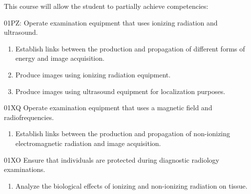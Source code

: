 {This course will allow the student to partially achieve competencies:

01PZ: Operate examination equipment that uses ionizing radiation and ultrasound.
\begin{enumerate}
\item Establish links between the production and propagation of different forms of energy and image acquisition.
\item Produce images using ionizing radiation equipment.
\item Produce images using ultrasound equipment for localization purposes.
\end{enumerate}

01XQ Operate examination equipment that uses a magnetic field and radiofrequencies.
\begin{enumerate}
\item Establish links between the production and propagation of non-ionizing electromagnetic radiation and image acquisition.
\end{enumerate}

01XO Ensure that individuals are protected during diagnostic radiology examinations.
\begin{enumerate}
\item Analyze the biological effects of ionizing and non-ionizing radiation on tissue.
\end{enumerate}
}
